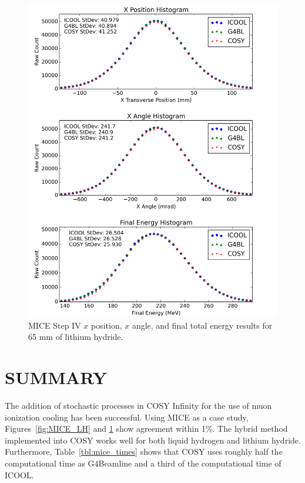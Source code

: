 \documentclass{jacow}
\begin{document}
\begin{figure}[htb]
  \centering
    \includegraphics[width=\columnwidth]{MICE_LiH} 
  \caption{MICE Step IV $x$ position, $x$ angle, and final total energy results for 65 mm of lithium hydride.}
  \label{fig:MICE_LiH}
\end{figure}


\section{SUMMARY}
The addition of stochastic processes in COSY Infinity for the use of muon ionization cooling has been successful. %
Using MICE as a case study, Figures~\ref{fig:MICE_LH} and \ref{fig:MICE_LiH} show agreement within 1\%. The hybrid method implemented into COSY works well for both liquid hydrogen and lithium hydride. Furthermore, Table~\ref{tbl:mice_times} shows that COSY uses roughly half the computational time as G4Beamline and a third of the computational time of ICOOL.
\end{document}
